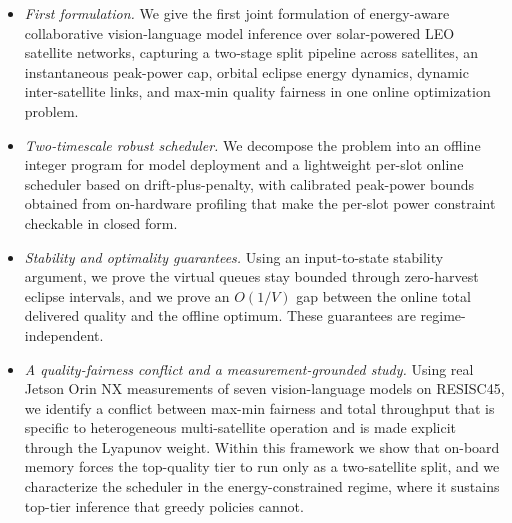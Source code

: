 
\begin{itemize}
  \item[\textbf{C1.}] \emph{First formulation.} We give the first joint formulation of
  energy-aware collaborative vision-language model inference over solar-powered LEO
  satellite networks, capturing a two-stage split pipeline across satellites, an
  instantaneous peak-power cap, orbital eclipse energy dynamics, dynamic inter-satellite
  links, and max-min quality fairness in one online optimization problem.

  \item[\textbf{C2.}] \emph{Two-timescale robust scheduler.} We decompose the problem into
  an offline integer program for model deployment and a lightweight per-slot online
  scheduler based on drift-plus-penalty, with calibrated peak-power bounds obtained from
  on-hardware profiling that make the per-slot power constraint checkable in closed form.

  \item[\textbf{C3.}] \emph{Stability and optimality guarantees.} Using an input-to-state
  stability argument, we prove the virtual queues stay bounded through zero-harvest eclipse
  intervals, and we prove an $O(1/V)$ gap between the online total delivered quality and the
  offline optimum. These guarantees are regime-independent.

  \item[\textbf{C4.}] \emph{A quality-fairness conflict and a measurement-grounded study.}
  Using real Jetson Orin NX measurements of seven vision-language models on RESISC45, we
  identify a conflict between max-min fairness and total throughput that is specific to
  heterogeneous multi-satellite operation and is made explicit through the Lyapunov weight.
  Within this framework we show that on-board memory forces the top-quality tier to run only
  as a two-satellite split, and we characterize the scheduler in the energy-constrained
  regime, where it sustains top-tier inference that greedy policies cannot.
\end{itemize}

